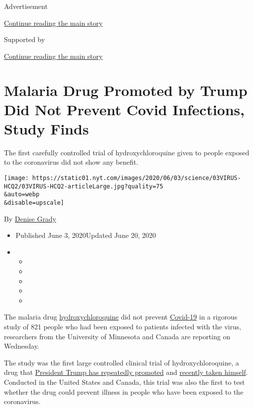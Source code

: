 Advertisement

\protect\hyperlink{after-top}{Continue reading the main story}

Supported by

\protect\hyperlink{after-sponsor}{Continue reading the main story}

\hypertarget{malaria-drug-promoted-by-trump-did-not-prevent-covid-infections-study-finds}{%
\section{Malaria Drug Promoted by Trump Did Not Prevent Covid
Infections, Study
Finds}\label{malaria-drug-promoted-by-trump-did-not-prevent-covid-infections-study-finds}}

The first carefully controlled trial of hydroxychloroquine given to
people exposed to the coronavirus did not show any benefit.

\texttt{[image: https://static01.nyt.com/images/2020/06/03/science/03VIRUS-HCQ2/03VIRUS-HCQ2-articleLarge.jpg?quality=75\\\&auto=webp\\\&disable=upscale]}

By \href{https://www.nytimes.com/by/denise-grady}{Denise Grady}

\begin{itemize}
\item
  Published June 3, 2020Updated June 20, 2020
\item
  \begin{itemize}
  \item
  \item
  \item
  \item
  \item
  \end{itemize}
\end{itemize}

The malaria drug
\href{https://www.nytimes.com/2020/06/20/health/hydroxychloroquine-coronavirus-trial.html}{hydroxychloroquine}
did not prevent
\href{https://www.nytimes.com/2020/06/15/health/fda-hydroxychloroquine-malaria.html}{Covid-19}
in a rigorous study of 821 people who had been exposed to patients
infected with the virus, researchers from the University of Minnesota
and Canada are reporting on Wednesday.

The study was the first large controlled clinical trial of
hydroxychloroquine, a drug that
\href{https://www.nytimes.com/2020/05/21/us/politics/trump-fact-check-hydroxychloroquine-coronavirus-.html}{President
Trump has repeatedly promoted} and
\href{https://www.nytimes.com/2020/05/18/us/politics/trump-hydroxychloroquine-covid-coronavirus.html}{recently
taken himself}. Conducted in the United States and Canada, this trial
was also the first to test whether the drug could prevent illness in
people who have been exposed to the coronavirus.

